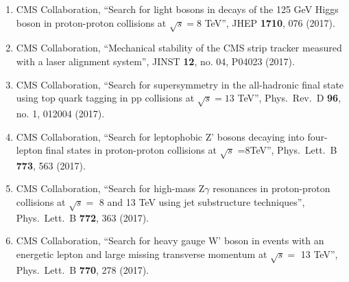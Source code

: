\begin{enumerate}
\item CMS Collaboration, ``Search for light bosons in decays of the 125 GeV Higgs boson in proton-proton collisions at $ \sqrt{s}=8 $ TeV'', JHEP {\bf 1710}, 076 (2017).

\item CMS Collaboration, ``Mechanical stability of the CMS strip tracker measured with a laser alignment system'', JINST {\bf 12}, no. 04, P04023 (2017).

\item CMS Collaboration, ``Search for supersymmetry in the all-hadronic final state using top quark tagging in pp collisions at $\sqrt s = 13$ TeV'', Phys.\ Rev.\ D {\bf 96}, no. 1, 012004 (2017).

\item CMS Collaboration, ``Search for leptophobic Z' bosons decaying into four-lepton final states in proton-proton collisions at $\sqrt s$ =8TeV'', Phys.\ Lett.\ B {\bf 773}, 563 (2017).

\item CMS Collaboration, ``Search for high-mass $\mathrm{ Z }\gamma$ resonances in proton-proton collisions at $\sqrt{s}=$ 8 and 13 TeV using jet substructure techniques'', Phys.\ Lett.\ B {\bf 772}, 363 (2017).

\item CMS Collaboration, ``Search for heavy gauge W' boson in events with an energetic lepton and large missing transverse momentum at $ \sqrt{s} = $ 13 TeV'', Phys.\ Lett.\ B {\bf 770}, 278 (2017).


\end{enumerate}
